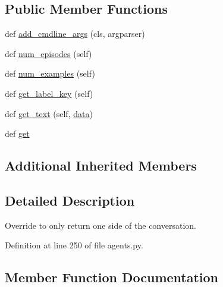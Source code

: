 \subsection*{Public Member Functions}
\begin{DoxyCompactItemize}
\item 
def \hyperlink{classparlai_1_1tasks_1_1igc_1_1agents_1_1IGCOneSideTeacher_ad57d48cb961ce41f24845361ca12cac7}{add\+\_\+cmdline\+\_\+args} (cls, argparser)
\item 
def \hyperlink{classparlai_1_1tasks_1_1igc_1_1agents_1_1IGCOneSideTeacher_acd2f7b3686dfb0223b513f5fbf5d59db}{num\+\_\+episodes} (self)
\item 
def \hyperlink{classparlai_1_1tasks_1_1igc_1_1agents_1_1IGCOneSideTeacher_a39b29631ff931751e6aa35119a09e399}{num\+\_\+examples} (self)
\item 
def \hyperlink{classparlai_1_1tasks_1_1igc_1_1agents_1_1IGCOneSideTeacher_aa2f9cd182fb837af0babaf21c64b0617}{get\+\_\+label\+\_\+key} (self)
\item 
def \hyperlink{classparlai_1_1tasks_1_1igc_1_1agents_1_1IGCOneSideTeacher_aa237039dbe3c14c4210f5806f2aa9c5c}{get\+\_\+text} (self, \hyperlink{classparlai_1_1tasks_1_1igc_1_1agents_1_1IGCTeacher_a23adac78cbb7a5761f66fea8809bcee4}{data})
\item 
def \hyperlink{classparlai_1_1tasks_1_1igc_1_1agents_1_1IGCOneSideTeacher_a90c812fb4446f6752e6917246aeee93a}{get}
\end{DoxyCompactItemize}
\subsection*{Additional Inherited Members}


\subsection{Detailed Description}
\begin{DoxyVerb}Override to only return one side of the conversation.
\end{DoxyVerb}
 

Definition at line 250 of file agents.\+py.



\subsection{Member Function Documentation}
\mbox{\label{classparlai_1_1tasks_1_1igc_1_1agents_1_1IGCOneSideTeacher_ad57d48cb961ce41f24845361ca12cac7}} 
